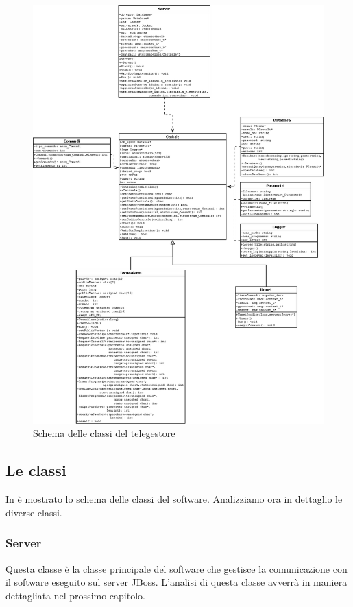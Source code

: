\begin{figure}[p]
	\centering
	\includegraphics[width=\linewidth]{pictures/classitele.png}
	\caption{Schema delle classi del telegestore}\label{fig:classitele}
\end{figure}
\subsection{Le classi}
In  è mostrato lo schema delle classi del software. Analizziamo ora in dettaglio le diverse classi.
\subsubsection{Server}
Questa classe è la classe principale del software che gestisce la comunicazione con il software eseguito sul server JBoss. L'analisi di questa classe avverrà in maniera dettagliata nel prossimo capitolo.
